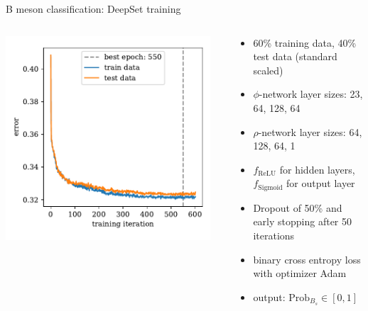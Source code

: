 \documentclass[aspectratio=1610, 10pt]{beamer}
\begin{document}
\begin{frame}{B meson classification: DeepSet training}
  
  \begin{columns}
    \begin{column}{0.4\textwidth}
      \centering
      \includegraphics[width=0.95\textwidth]{images/B_history_error.pdf}
    \end{column}
    \begin{column}{0.6\textwidth}
      \begin{itemize}
        \item 60\% training data, 40\% test data (standard scaled)
        \item $\phi$-network layer sizes: 23, 64, 128, 64
        \item $\rho$-network layer sizes: 64, 128, 64, 1
        \item $f_\text{ReLU}$ for hidden layers, $f_\text{Sigmoid}$ for output layer 
        \item Dropout of 50\% and early stopping after 50 iterations 
        \item binary cross entropy loss with optimizer Adam
        \item output: $\text{Prob}_{B_s} \in [0,1]$
      \end{itemize}
    \end{column}
  \end{columns}
\end{frame}
\end{document}
